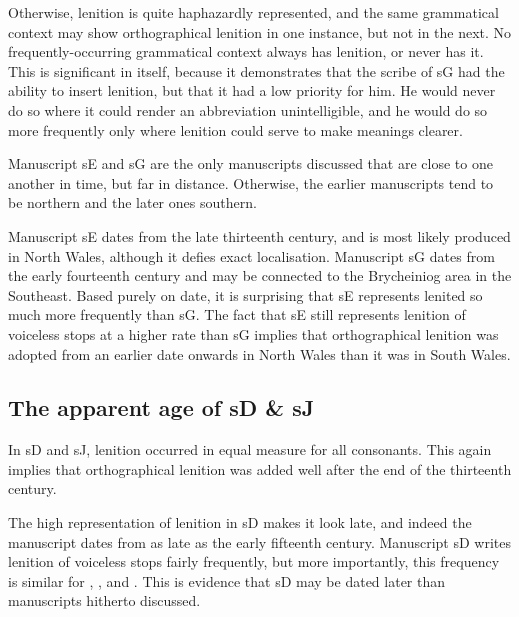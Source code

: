 Otherwise, lenition is quite haphazardly represented, and the same grammatical context may show orthographical lenition in one instance, but not in the next. No frequently-occurring grammatical context always has lenition, or never has it. This is significant in itself, because it demonstrates that the scribe of \gls{sG} had the ability to insert lenition, but that it had a low priority for him. He would never do so where it could render an abbreviation unintelligible, and he would do so more frequently only where lenition could serve to make meanings clearer.

Manuscript \gls{sE} and \gls{sG} are the only manuscripts discussed that are close to one another in time, but far in distance. Otherwise, the earlier manuscripts tend to be northern and the later ones southern.

Manuscript \gls{sE} dates from the late thirteenth century, and is most likely produced in North Wales, although it defies exact localisation. Manuscript \gls{sG} dates from the early fourteenth century and may be connected to the Brycheiniog area in the Southeast. Based purely on date, it is surprising that \gls{sE} represents lenited  so much more frequently than \gls{sG}. The fact that \gls{sE} still represents lenition of voiceless stops at a higher rate than \gls{sG} implies that orthographical lenition was adopted from an earlier date onwards in North Wales than it was in South Wales.


\subsection{The apparent age of \gls{sD} \& \gls{sJ}}
\label{sec:apparent-age-glssd}

In \gls{sD} and \gls{sJ}, lenition occurred in equal measure for all consonants. This again implies that orthographical lenition was added well after the end of the thirteenth century. 


The high representation of lenition in \gls{sD} makes it look late, and indeed the manuscript dates from as late as the early fifteenth century. Manuscript \gls{sD} writes lenition of voiceless stops fairly frequently, but more importantly, this frequency is similar for , , and . This is evidence that \gls{sD} may be dated later than manuscripts hitherto discussed.

